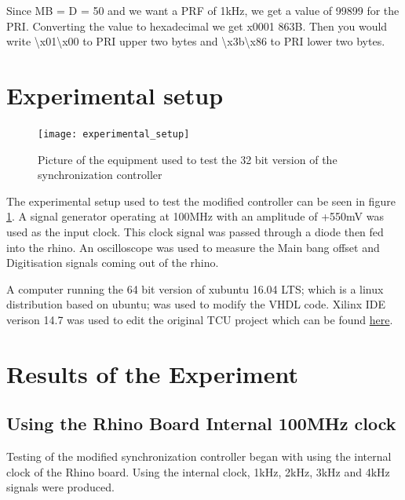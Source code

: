\documentclass[12pt, a4paper]{article}
\begin{document}
Since MB = D = 50 and we want a PRF of 1kHz, we get a value of 99899 for the PRI. Converting the value to hexadecimal we get x0001 863B. Then you would write \textbackslash x01\textbackslash x00 to PRI upper two bytes and \textbackslash x3b\textbackslash x86 to PRI lower two bytes.

\section{Experimental setup}

	\begin{figure}[h]
		\centering
		\texttt{[image: experimental\_setup]}
		\caption{Picture of the equipment used to test the 32 bit version of the synchronization controller}
		\label{fig:exp_setup}
	\end{figure}
	

The experimental setup used to test the modified controller can be seen in figure \ref{fig:exp_setup}. A signal generator operating at 100MHz with an amplitude of +550mV was used as the input clock. This clock signal was passed through a diode then fed into the rhino. An oscilloscope was used to measure the Main bang offset and Digitisation signals coming out of the rhino. 

A computer running the 64 bit version of xubuntu 16.04 LTS; which is a linux distribution based on ubuntu; was used to modify the VHDL code. Xilinx IDE verison 14.7 was used to edit the original TCU  project which can be found \href{https://github.com/Skippy01/NeXtRAD-TCU/tree/master/NeXtRAD-TCU-Controller}{here}.



\section{Results of the Experiment}

\subsection{Using the Rhino Board Internal 100MHz clock}

Testing of the modified synchronization controller began with using the internal clock of the Rhino board. Using the internal clock, 1kHz, 2kHz, 3kHz and 4kHz signals were produced. 
\end{document}
